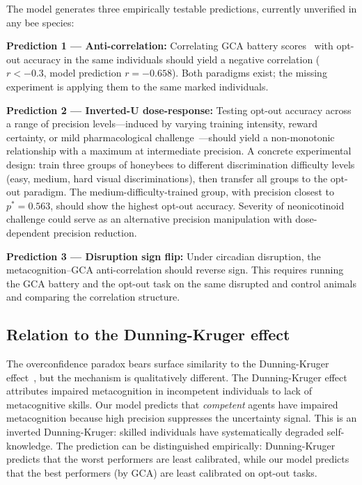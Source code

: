 \documentclass[12pt]{article}
\newcommand{\pstar}{p^*}
\begin{document}
The model generates three empirically testable predictions, currently unverified in any bee species:

\textbf{Prediction 1 --- Anti-correlation:} Correlating GCA battery scores~\cite{AnimalCog2024}
with opt-out accuracy in the same individuals should yield a negative correlation ($r < -0.3$,
model prediction $r = -0.658$). Both paradigms exist; the missing experiment is applying them to
the same marked individuals.

\textbf{Prediction 2 --- Inverted-U dose-response:} Testing opt-out accuracy across a range of
precision levels---induced by varying training intensity, reward certainty, or mild pharmacological
challenge~\cite{SciReports2020}---should yield a non-monotonic relationship with a maximum at
intermediate precision. A concrete experimental design: train three groups of honeybees to
different discrimination difficulty levels (easy, medium, hard visual discriminations), then
transfer all groups to the opt-out paradigm. The medium-difficulty-trained group, with
precision closest to $\pstar = 0.563$, should show the highest opt-out accuracy. Severity of
neonicotinoid challenge could serve as an alternative precision manipulation with dose-dependent
precision reduction.

\textbf{Prediction 3 --- Disruption sign flip:} Under circadian disruption, the
metacognition--GCA anti-correlation should reverse sign. This requires running the GCA battery and
the opt-out task on the same disrupted and control animals and comparing the correlation structure.

\subsection*{Relation to the Dunning-Kruger effect}

The overconfidence paradox bears surface similarity to the Dunning-Kruger
effect~\cite{DunningKruger1999}, but the mechanism is qualitatively different. The Dunning-Kruger
effect attributes impaired metacognition in incompetent individuals to lack of metacognitive skills.
Our model predicts that \emph{competent} agents have impaired metacognition because high precision
suppresses the uncertainty signal. This is an inverted Dunning-Kruger: skilled individuals have
systematically degraded self-knowledge. The prediction can be distinguished empirically: Dunning-Kruger
predicts that the worst performers are least calibrated, while our model predicts that the best
performers (by GCA) are least calibrated on opt-out tasks.
\end{document}
